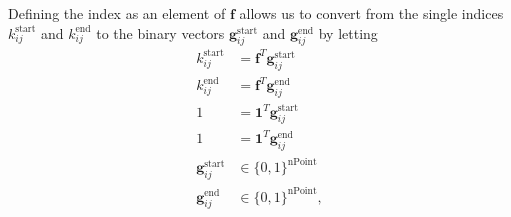 Defining the index as an element of $\mathbf{f}$ allows us to convert from the single indices $k_{ij}^{\text{start}}$ and $k_{ij}^{\text{end}}$ to the binary vectors $\mathbf{g}_{ij}^{\text{start}}$ and $\mathbf{g}_{ij}^{\text{end}}$ by letting 
\begin{equation}\label{eqn:idxStart}\begin{aligned}
	k^{\text{start}}_{ij}        &= \mathbf{f}^T\mathbf{g}^{\text{start}}_{ij} \\
	k^{\text{end}}_{ij}         &= \mathbf{f}^T\mathbf{g}^{\text{end}}_{ij}  \\ 
	1                            &= \mathbf{1}^T\mathbf{g}^{\text{start}}_{ij} \\
	1                            &= \mathbf{1}^T\mathbf{g}^{\text{end}}_{ij}  \\
	\mathbf{g}^{\text{start}}_{ij}  &\in \{0,1\}^{\text{nPoint}}                \\
	\mathbf{g}^{\text{end}}_{ij} &\in \{0,1\}^{\text{nPoint}},
\end{aligned} \end{equation}

